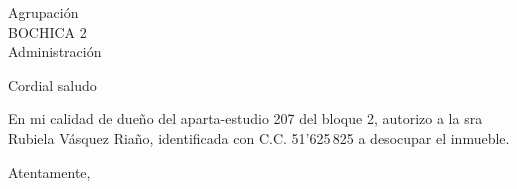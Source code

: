 \documentclass[letterpaper,spanish]{letter}
\begin{document}
\begin{letter}{Agrupación\\BOCHICA 2\\Administración}
	
\opening{Cordial saludo}
En mi calidad de dueño del aparta-estudio 207 del bloque 2, autorizo a la sra Rubiela Vásquez Riaño, identificada con C.C. 51'625\,825 a desocupar el inmueble.

\closing{Atentamente,}


\end{letter}
\end{document}
